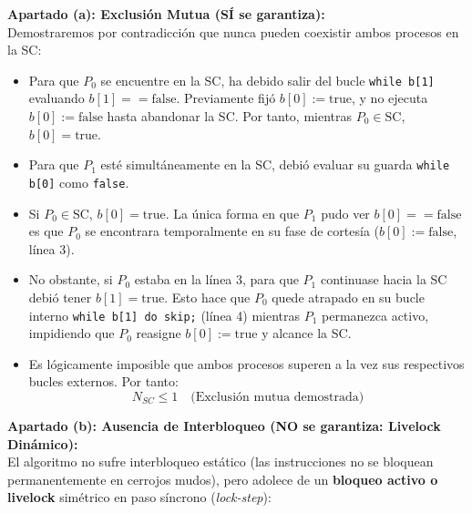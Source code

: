 \documentclass[11pt,a4paper,twoside,openright]{report}
\begin{document}
\begin{solucion}
\textbf{Apartado (a): Exclusión Mutua (SÍ se garantiza):}\\
Demostraremos por contradicción que nunca pueden coexistir ambos procesos en la SC:
\begin{itemize}[leftmargin=*]
    \item Para que $P_0$ se encuentre en la SC, ha debido salir del bucle \texttt{while b[1]} evaluando $b[1] == \text{false}$. Previamente fijó $b[0] := \text{true}$, y no ejecuta $b[0] := \text{false}$ hasta abandonar la SC. Por tanto, mientras $P_0 \in \text{SC}$, $b[0] = \text{true}$.
    \item Para que $P_1$ esté simultáneamente en la SC, debió evaluar su guarda \texttt{while b[0]} como \texttt{false}.
    \item Si $P_0 \in \text{SC}$, $b[0] = \text{true}$. La única forma en que $P_1$ pudo ver $b[0] == \text{false}$ es que $P_0$ se encontrara temporalmente en su fase de cortesía ($b[0] := \text{false}$, línea 3).
    \item No obstante, si $P_0$ estaba en la línea 3, para que $P_1$ continuase hacia la SC debió tener $b[1] = \text{true}$. Esto hace que $P_0$ quede atrapado en su bucle interno \texttt{while b[1] do skip;} (línea 4) mientras $P_1$ permanezca activo, impidiendo que $P_0$ reasigne $b[0]:=\text{true}$ y alcance la SC.
    \item Es lógicamente imposible que ambos procesos superen a la vez sus respectivos bucles externos. Por tanto:
    \[
    N_{SC} \le 1 \quad \text{(Exclusión mutua demostrada)}
    \]
\end{itemize}

\textbf{Apartado (b): Ausencia de Interbloqueo (NO se garantiza: Livelock Dinámico):}\\
El algoritmo no sufre interbloqueo estático (las instrucciones no se bloquean permanentemente en cerrojos mudos), pero adolece de un \textbf{bloqueo activo o livelock} simétrico en paso síncrono (\emph{lock-step}):


\end{solucion}
\end{document}
